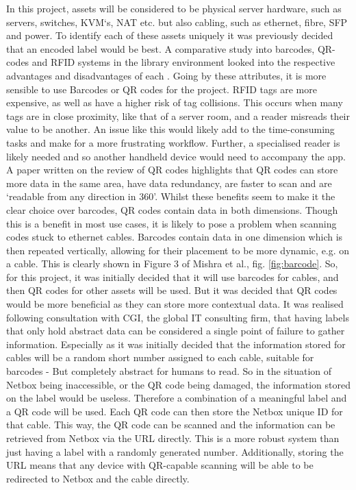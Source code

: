 \documentclass [11pt,a4paper]{article}
\begin{document}
In this project, assets will be considered to be physical server hardware, such as servers, switches, KVM`s, NAT etc. but also cabling, such as ethernet, fibre, SFP and power. To identify each of these assets uniquely it was previously decided that an encoded label would be best. A comparative study into barcodes, QR-codes and RFID systems in the library environment looked into the respective advantages and disadvantages of each \cite{lotlikar2013comparative}. Going by these attributes, it is more sensible to use Barcodes or QR codes for the project. RFID tags are more expensive, as well as have a higher risk of tag collisions. This occurs when many tags are in close proximity\cite{lotlikar2013comparative}, like that of a server room, and a reader misreads their value to be another. An issue like this would likely add to the time-consuming tasks and make for a more frustrating workflow. Further, a specialised reader is likely needed and so another handheld device would need to accompany the app. A paper written on the review of QR codes highlights that QR codes can store more data in the same area, have data redundancy, are faster to scan and are `readable from any direction in 360\degree'\cite{mishra2017review}. Whilst these benefits seem to make it the clear choice over barcodes, QR codes contain data in both dimensions. Though this is a benefit in most use cases, it is likely to pose a problem when scanning codes stuck to ethernet cables.
Barcodes contain data in one dimension which is then repeated vertically, allowing for their placement to be more dynamic, e.g. on a cable. This is clearly shown in Figure 3 of Mishra et al., fig. \ref{fig:barcode}. So, for this project, it was initially decided that it will use barcodes for cables, and then QR codes for other assets will be used. But it was decided that QR codes would be more beneficial as they can store more contextual data. It was realised following consultation with CGI, the global IT consulting firm, that having labels that only hold abstract data can be considered a single point of failure to gather information. Especially as it was initially decided that the information stored for cables will be a random short number assigned to each cable, suitable for barcodes - But completely abstract for humans to read. So in the situation of Netbox being inaccessible, or the QR code being damaged, the information stored on the label would be useless. Therefore a combination of a meaningful label and a QR code will be used. Each QR code can then store the Netbox unique ID for that cable. This way, the QR code can be scanned and the information can be retrieved from Netbox via the URL directly. This is a more robust system than just having a label with a randomly generated number. Additionally, storing the URL means that any device with QR-capable scanning will be able to be redirected to Netbox and the cable directly.
\end{document}
